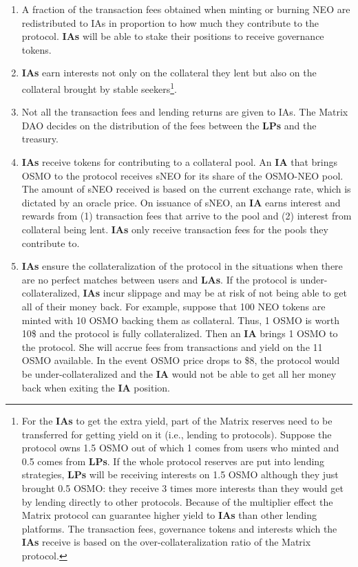 \documentclass[%
 reprint,
nofootinbib,
 amsmath,amssymb,
 aps,
]{revtex4-2}
\begin{document}
\begin{enumerate}
\item 
  A fraction of the transaction fees obtained when minting or burning NEO are redistributed to IAs in proportion to how much they contribute to the protocol. \textbf{IAs}  will be able to stake their positions to receive governance tokens.
\item 
  \textbf{IAs} earn interests not only on the collateral they lent but also on the collateral brought by stable seekers\footnote{For the \textbf{IAs} to get the extra yield, part of the Matrix reserves need to be transferred for getting yield on it (i.e., lending to protocols). Suppose the protocol owns 1.5 OSMO out of which 1 comes from users who minted and 0.5 comes from \textbf{LPs}. If the whole protocol reserves are put into lending strategies, \textbf{LPs} will be receiving interests on 1.5 OSMO although they just brought 0.5 OSMO: they receive 3 times more interests than they would get by lending directly to other protocols. Because of the multiplier effect the Matrix protocol can guarantee higher yield to \textbf{IAs} than other lending platforms. The transaction fees, governance tokens and interests which the \textbf{IAs} receive is based on the over-collateralization ratio of the Matrix protocol.}.
\item 
  Not all the transaction fees and lending returns are given to IAs. The Matrix DAO decides on the distribution of the fees between the \textbf{LPs} and the treasury. 
\item 
  \textbf{IAs} receive tokens for contributing to a collateral pool. An \textbf{IA} that brings OSMO to the protocol receives sNEO for its share of the OSMO-NEO pool. The amount of sNEO received is based on the current exchange rate, which is dictated by an oracle price. On issuance of sNEO, an \textbf{IA} earns interest and rewards from (1) transaction fees that arrive to the pool and (2) interest from collateral being lent. \textbf{IAs} only receive transaction fees for the pools they contribute to. 
\item 
  \textbf{IAs} ensure the collateralization of the protocol in the situations when there are no perfect matches between users and \textbf{LAs}. If the protocol is under-collateralized, \textbf{IAs} incur slippage and may be at risk of not being able to get all of their money back. 
  For example, suppose that 100 NEO tokens are minted with 10 OSMO backing them as collateral. Thus,  1 OSMO is worth 10\$ and the protocol is fully collateralized. Then an \textbf{IA} brings 1 OSMO to the protocol. She will accrue fees from transactions and yield on the 11 OSMO available. In the event OSMO price drops to  \$8, the protocol would be under-collateralized and the \textbf{IA} would not be able to get all her money back when exiting the \textbf{IA} position. 

\end{enumerate}
\end{document}

